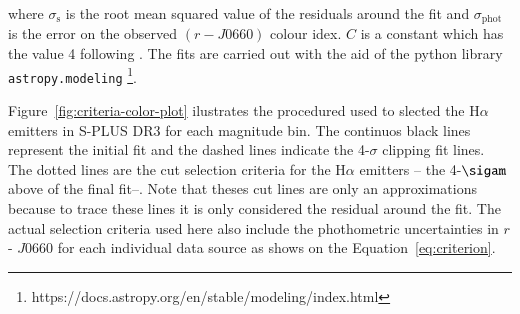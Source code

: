 \documentclass[fleqn,usenatbib]{mnras}
\begin{document}
 where $\sigma_{\mathrm{s}}$ is the root mean squared value of the residuals around
 the fit and $\sigma_{\mathrm{phot}}$ is the error on the observed $(r - J0660)$ colour idex.
 $C$ is a constant which has the value 4 following \citet{Wevers:2017}.
The fits are carried out with the aid of the python library \texttt{astropy.modeling}
\footnote{https://docs.astropy.org/en/stable/modeling/index.html}.

Figure~\ref{fig:criteria-color-plot} ilustrates the procedured used to slected the H{$\alpha$}
emitters in S-PLUS DR3 for each magnitude bin. The continuos black lines represent the initial
fit and  the dashed lines indicate the 4-$\sigma$ clipping fit lines. The dotted lines are
the cut selection criteria for the H{$\alpha$} emitters -- the 4-$\sigam$ above of the final
fit--. Note that theses cut lines are only an approximations because to trace these lines
it is only considered the residual around the fit. The actual selection criteria used here
also include the phothometric uncertainties in $r$ - $J$0660 for each individual data source as
shows on the Equation~\ref{eq:criterion}.
\end{document}
